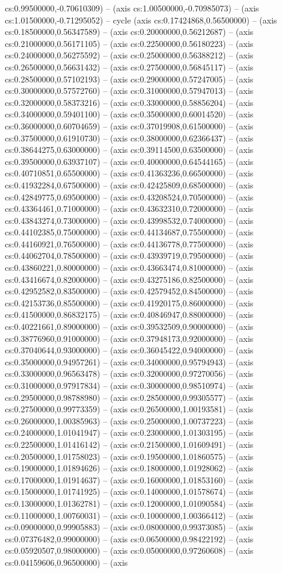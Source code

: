 cs:0.99500000,-0.70610309) -- (axis cs:1.00500000,-0.70985073) -- (axis cs:1.01500000,-0.71295052) -- cycle (axis cs:0.17424868,0.56500000) -- (axis cs:0.18500000,0.56347589) -- (axis cs:0.20000000,0.56212687) -- (axis cs:0.21000000,0.56171105) -- (axis cs:0.22500000,0.56180223) -- (axis cs:0.24000000,0.56275592) -- (axis cs:0.25000000,0.56388212) -- (axis cs:0.26500000,0.56631432) -- (axis cs:0.27500000,0.56845117) -- (axis cs:0.28500000,0.57102193) -- (axis cs:0.29000000,0.57247005) -- (axis cs:0.30000000,0.57572760) -- (axis cs:0.31000000,0.57947013) -- (axis cs:0.32000000,0.58373216) -- (axis cs:0.33000000,0.58856204) -- (axis cs:0.34000000,0.59401100) -- (axis cs:0.35000000,0.60014520) -- (axis cs:0.36000000,0.60704659) -- (axis cs:0.37019908,0.61500000) -- (axis cs:0.37500000,0.61910730) -- (axis cs:0.38000000,0.62366437) -- (axis cs:0.38644275,0.63000000) -- (axis cs:0.39114500,0.63500000) -- (axis cs:0.39500000,0.63937107) -- (axis cs:0.40000000,0.64544165) -- (axis cs:0.40710851,0.65500000) -- (axis cs:0.41363236,0.66500000) -- (axis cs:0.41932284,0.67500000) -- (axis cs:0.42425809,0.68500000) -- (axis cs:0.42849775,0.69500000) -- (axis cs:0.43208524,0.70500000) -- (axis cs:0.43364461,0.71000000) -- (axis cs:0.43632310,0.72000000) -- (axis cs:0.43843274,0.73000000) -- (axis cs:0.43998532,0.74000000) -- (axis cs:0.44102385,0.75000000) -- (axis cs:0.44134687,0.75500000) -- (axis cs:0.44160921,0.76500000) -- (axis cs:0.44136778,0.77500000) -- (axis cs:0.44062704,0.78500000) -- (axis cs:0.43939719,0.79500000) -- (axis cs:0.43860221,0.80000000) -- (axis cs:0.43663474,0.81000000) -- (axis cs:0.43416674,0.82000000) -- (axis cs:0.43275186,0.82500000) -- (axis cs:0.42952582,0.83500000) -- (axis cs:0.42579452,0.84500000) -- (axis cs:0.42153736,0.85500000) -- (axis cs:0.41920175,0.86000000) -- (axis cs:0.41500000,0.86832175) -- (axis cs:0.40846947,0.88000000) -- (axis cs:0.40221661,0.89000000) -- (axis cs:0.39532509,0.90000000) -- (axis cs:0.38776960,0.91000000) -- (axis cs:0.37948173,0.92000000) -- (axis cs:0.37040644,0.93000000) -- (axis cs:0.36045422,0.94000000) -- (axis cs:0.35000000,0.94957261) -- (axis cs:0.34000000,0.95794943) -- (axis cs:0.33000000,0.96563478) -- (axis cs:0.32000000,0.97270056) -- (axis cs:0.31000000,0.97917834) -- (axis cs:0.30000000,0.98510974) -- (axis cs:0.29500000,0.98788980) -- (axis cs:0.28500000,0.99305577) -- (axis cs:0.27500000,0.99773359) -- (axis cs:0.26500000,1.00193581) -- (axis cs:0.26000000,1.00385963) -- (axis cs:0.25000000,1.00737223) -- (axis cs:0.24000000,1.01041947) -- (axis cs:0.23000000,1.01303195) -- (axis cs:0.22500000,1.01416142) -- (axis cs:0.21500000,1.01609491) -- (axis cs:0.20500000,1.01758023) -- (axis cs:0.19500000,1.01860575) -- (axis cs:0.19000000,1.01894626) -- (axis cs:0.18000000,1.01928062) -- (axis cs:0.17000000,1.01914637) -- (axis cs:0.16000000,1.01853160) -- (axis cs:0.15000000,1.01741925) -- (axis cs:0.14000000,1.01578674) -- (axis cs:0.13000000,1.01362781) -- (axis cs:0.12000000,1.01090584) -- (axis cs:0.11000000,1.00760031) -- (axis cs:0.10000000,1.00366412) -- (axis cs:0.09000000,0.99905883) -- (axis cs:0.08000000,0.99373085) -- (axis cs:0.07376482,0.99000000) -- (axis cs:0.06500000,0.98422192) -- (axis cs:0.05920507,0.98000000) -- (axis cs:0.05000000,0.97260608) -- (axis cs:0.04159606,0.96500000) -- (axis 